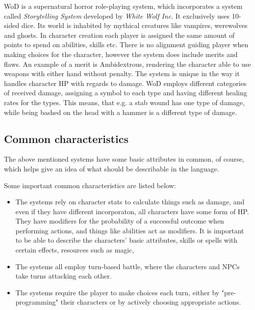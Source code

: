 WoD is a supernatural horror role-playing system, which incorporates a system called \emph{Storytelling System} developed by \emph{White Wolf Inc}. It exclusively uses 10-sided dice\cite{Appelcline2007}. Its world is inhabited by mythical creatures like vampires, werewolves and ghosts. In character creation each player is assigned the same amount of points to spend on abilities, skills etc. There is no alignment guiding player when making choices for the character, however the system does include merits and flaws. An example of a merit is Ambidextrous, rendering the character able to use weapons with either hand without penalty. The system is unique in the way it handles character HP with regards to damage. WoD employs different categories of received damage, assigning a symbol to each type and having different healing rates for the types.\cite{wod} This means, that e.g. a stab wound has one type of damage, while being bashed on the head with a hammer is a different type of damage.

\subsection{Common characteristics}
\label{baseclasses}
The above mentioned systems have some basic attributes in common, of course, which helps give an idea of what should be describable in the language.

Some important common characteristics are listed below:
\begin{itemize}
	\item The systems rely on character stats to calculate things such as damage, and even if they have different incorporaton, all characters have some form of HP. They have modifiers for the probability of a successful outcome when performing actions, and things like abilities act as modifiers. It is important to be able to describe the characters' basic attributes, skills or spells with certain effects, resources such as magic, 
	\item The systems all employ turn-based battle, where the characters and NPCs take turns attacking each other. 
	\item The systems require the player to make choices each turn, either by "pre-programming" their characters or by actively choosing appropriate actions.
\end{itemize}


